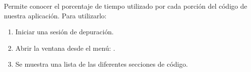 \documentclass[letterpaper,10pt,english]{sphinxmanual}
\begin{document}
\sphinxAtStartPar
Permite conocer el porcentaje de tiempo utilizado por cada porción del código de nuestra aplicación.
Para utilizarlo:
\begin{enumerate}
%
\item {} 
\sphinxAtStartPar
Iniciar una sesión de depuración.

\item {} 
\sphinxAtStartPar
Abrir la ventana desde el menú: .

\item {} 
\sphinxAtStartPar
Se muestra una lista de las diferentes secciones de código.

\end{enumerate}

\begin{figure}[htbp]
\centering

\noindent{}
\end{figure}
\end{document}
